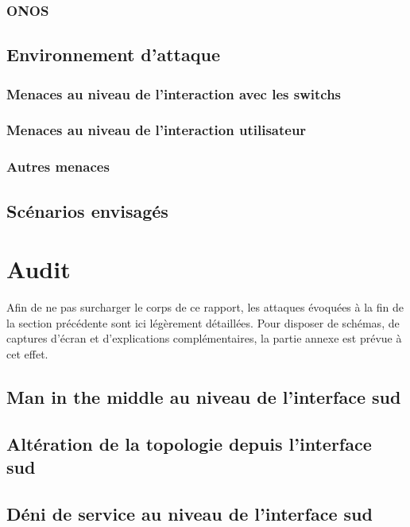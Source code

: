 \documentclass[11pt]{article}
\begin{document}
		\subsubsection{ONOS}
			
	\subsection{Environnement d'attaque}
		
		\subsubsection{Menaces au niveau de l'interaction avec les switchs}
			
		\subsubsection{Menaces au niveau de l'interaction utilisateur}
			
		\subsubsection{Autres menaces}
			
	\subsection{Scénarios envisagés}
		
\newpage
{}
\section{Audit}
	Afin de ne pas surcharger le corps de ce rapport, les attaques évoquées à la fin de la section précédente sont ici légèrement détaillées. Pour disposer de schémas, de captures d'écran et d'explications complémentaires, la partie annexe est prévue à cet effet.
	\subsection{Man in the middle au niveau de l'interface sud}
		
		\newpage
	\subsection{Altération de la topologie depuis l'interface sud}
		
		\newpage
	\subsection{Déni de service au niveau de l'interface sud}
		
		\newpage
\end{document}
